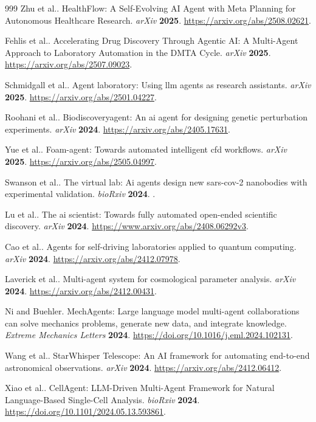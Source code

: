 \begin{thebibliography}{999}
Zhu et al..
HealthFlow: A Self-Evolving AI Agent with Meta Planning for Autonomous Healthcare Research.
\emph{arXiv} \textbf{2025}.
\url{https://arxiv.org/abs/2508.02621}.

Fehlis et al..
Accelerating Drug Discovery Through Agentic AI: A Multi-Agent Approach to Laboratory Automation in the DMTA Cycle.
\emph{arXiv} \textbf{2025}.
\url{https://arxiv.org/abs/2507.09023}.

Schmidgall et al..
Agent laboratory: Using llm agents as research assistants.
\emph{arXiv} \textbf{2025}.
\url{https://arxiv.org/abs/2501.04227}.

Roohani et al..
Biodiscoveryagent: An ai agent for designing genetic perturbation experiments.
\emph{arXiv} \textbf{2024}.
\url{https://arxiv.org/abs/2405.17631}.

Yue et al..
Foam-agent: Towards automated intelligent cfd workflows.
\emph{arXiv} \textbf{2025}.
\url{https://arxiv.org/abs/2505.04997}.

Swanson et al..
The virtual lab: Ai agents design new sars-cov-2 nanobodies with experimental validation.
\emph{bioRxiv} \textbf{2024}.
\url{}.

Lu et al..
The ai scientist: Towards fully automated open-ended scientific discovery.
\emph{arXiv} \textbf{2024}.
\url{https://www.arxiv.org/abs/2408.06292v3}.

Cao et al..
Agents for self-driving laboratories applied to quantum computing.
\emph{arXiv} \textbf{2024}.
\url{https://arxiv.org/abs/2412.07978}.

Laverick et al..
Multi-agent system for cosmological parameter analysis.
\emph{arXiv} \textbf{2024}.
\url{https://arxiv.org/abs/2412.00431}.

Ni and Buehler.
MechAgents: Large language model multi-agent collaborations can solve mechanics problems, generate new data, and integrate knowledge.
\emph{Extreme Mechanics Letters} \textbf{2024}.
\url{https://doi.org/10.1016/j.eml.2024.102131}.

Wang et al..
StarWhisper Telescope: An AI framework for automating end-to-end astronomical observations.
\emph{arXiv} \textbf{2024}.
\url{https://arxiv.org/abs/2412.06412}.

Xiao et al..
CellAgent: LLM-Driven Multi-Agent Framework for Natural Language-Based Single-Cell Analysis.
\emph{bioRxiv} \textbf{2024}.
\url{https://doi.org/10.1101/2024.05.13.593861}.


\end{thebibliography}
